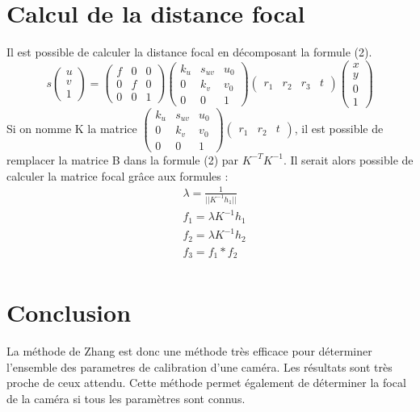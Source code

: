 \documentclass[a4paper,10pt]{article}
\begin{document}
\section{Calcul de la distance focal}
Il est possible de calculer la distance focal en décomposant la formule (2).
\begin{equation}
 s\begin{pmatrix}u\\v\\1\end{pmatrix} = \begin{pmatrix}f&0&0\\0&f&0\\0&0&1\end{pmatrix}\begin{pmatrix}k_u&s_{uv}&u_0\\0&k_v&v_0\\0&0&1\end{pmatrix}
					\begin{pmatrix}r_1&r_2&r_3&t\end{pmatrix}\begin{pmatrix}x\\y\\0\\1\end{pmatrix}
\end{equation}
Si on nomme K la matrice $\begin{pmatrix}k_u&s_{uv}&u_0\\0&k_v&v_0\\0&0&1\end{pmatrix}\begin{pmatrix}r_1&r_2&t\end{pmatrix}$, il est possible de 
remplacer la matrice B dans la formule (2) par $K^{-T}K^{-1}$. 
Il serait alors possible de calculer la matrice focal grâce aux formules :
\begin{align}
 &\lambda = \frac{1}{||K^{-1}h_1||}\\
 &f_1=\lambda K^{-1}h_1\\
 &f_2=\lambda K^{-1}h_2\\
 &f_3=f_1*f_2\\
\end{align}

\section{Conclusion}
La méthode de Zhang est donc une méthode très efficace pour déterminer l'ensemble des parametres
de calibration d'une caméra. Les résultats sont très proche de ceux attendu. Cette méthode
permet également de déterminer la focal de la caméra si tous les paramètres sont connus.
\end{document}
